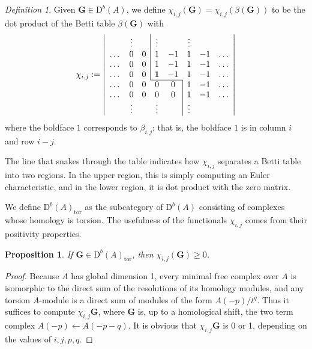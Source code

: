 \documentclass[12pt]{amsart}
\newtheorem{prop}[lemma]{Proposition}
\theoremstyle{definition}
\theoremstyle{remark}
\newtheorem{defn}[lemma]{Definition}
\newcommand{\Gbull}{\mathbf{G}}
\newcommand{\DD}{\mathrm{D}}
\begin{document}
\begin{defn}\label{defn:chi}
Given $\Gbull\in \DD^b(A)$, we define $\chi_{i,j}(\Gbull)=\chi_{i,j}(\beta(\Gbull))$ to be the dot product of the Betti table $\beta(\Gbull)$ with
\begin{equation}\label{eqn:chi}
\chi_{i,j}:=
\left|
\begin{array}{cccccccc}
 & \vdots& &\multicolumn{1}{|c}{\vdots}&& \vdots&&\\
\dots&0&0&\multicolumn{1}{|c}{1}&-1&1&-1&\dots\\
\dots&0&0&\multicolumn{1}{|c}{1}&-1&1&-1&\dots\\
\dots&0&0&\multicolumn{1}{|c}{\mathbf{1}}&-1&1&-1&\dots\\ \cline{4-5}
\dots&0&0&0&0&\multicolumn{1}{|c}{1}&-1&\dots\\
\dots&0&0&0&0&\multicolumn{1}{|c}{1}&-1&\dots\\
& \vdots&&\vdots&& \multicolumn{1}{|c}{\vdots}&&\\
\end{array}
\right|
\end{equation}
where the boldface $1$ corresponds to $\beta_{i,j}$; that is, the boldface $1$ is in column $i$ and row $i-j$. 
\end{defn}
The line that snakes through
the table indicates how $\chi_{i,j}$ separates a Betti table into two regions.  In the upper region, this is simply computing an Euler characteristic, and in the lower region, it is dot product with the zero matrix. 

We define $\DD^b(A)_{\text{tor}}$ as the subcategory of $\DD^b(A)$ consisting of complexes whose homology is torsion.
The usefulness of the functionals $\chi_{i,j}$ comes from their positivity properties.

\begin{prop}\label{lem:chi nonneg}
If $\Gbull \in \DD^b(A)_{\text{tor}}$, then $\chi_{i,j}(\Gbull)\geq 0$.
\end{prop}

\begin{proof} Because $A$ has global dimension 1, every minimal free complex
over $A$ is isomorphic to the direct sum of the resolutions of its homology modules, 
and any torsion $A$-module is a direct sum of modules of the form
 $A(-p)/t^q$. Thus it suffices to compute $\chi_{i,j}\Gbull$, where
$
\Gbull
$
is, up to a homological shift, the two term complex
$A(-p)\leftarrow A(-p-q)$.  It is obvious that $\chi_{i,j}\Gbull$ is 0 or 1,
depending on the values of $i,j,p,q$.
\end{proof}
\end{document}
